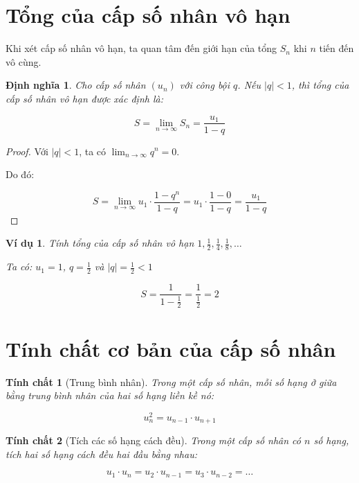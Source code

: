 \documentclass[12pt,a4paper]{report}
\newtheorem{definition}{Định nghĩa}[section]
\newtheorem{property}{Tính chất}[section]
\newtheorem{example}{Ví dụ}[section]
\begin{document}
\section{Tổng của cấp số nhân vô hạn}

Khi xét cấp số nhân vô hạn, ta quan tâm đến giới hạn của tổng $S_n$ khi $n$ tiến đến vô cùng.

\begin{definition}
    Cho cấp số nhân $(u_n)$ với công bội $q$. Nếu $|q| < 1$, thì tổng của cấp số nhân vô hạn được xác định là:
    
    \[
        S = \lim_{n \to \infty} S_n
        = \frac{u_1}{1 - q}
    \]
\end{definition}

\begin{proof}
    Với $|q| < 1$, ta có $\lim_{n \to \infty} q^n = 0$.
    
    Do đó:
    
    \[
        S
        = \lim_{n \to \infty}
        u_1 \cdot \frac{1 - q^n}{1 - q}
        = u_1 \cdot \frac{1 - 0}{1 - q}
        = \frac{u_1}{1 - q}
    \]
\end{proof}

\begin{example}
    Tính tổng của cấp số nhân vô hạn
    $1, \frac{1}{2}, \frac{1}{4}, \frac{1}{8}, \dots$
    
    Ta có:
    $u_1 = 1$, $q = \frac{1}{2}$ và $|q| = \frac{1}{2} < 1$
    
    \[
        S
        = \frac{1}{1 - \frac{1}{2}}
        = \frac{1}{\frac{1}{2}}
        = 2
    \]
\end{example}

\section{Tính chất cơ bản của cấp số nhân}

\begin{property}[Trung bình nhân]
    Trong một cấp số nhân, mỗi số hạng ở giữa bằng trung bình nhân của hai số hạng liền kề nó:
    
    \[
        u_n^2 = u_{n-1} \cdot u_{n+1}
    \]
\end{property}

\begin{property}[Tích các số hạng cách đều]
    Trong một cấp số nhân có $n$ số hạng, tích hai số hạng cách đều hai đầu bằng nhau:
    
    \[
        u_1 \cdot u_n
        = u_2 \cdot u_{n-1}
        = u_3 \cdot u_{n-2}
        = \dots
    \]
\end{property}
\end{document}

